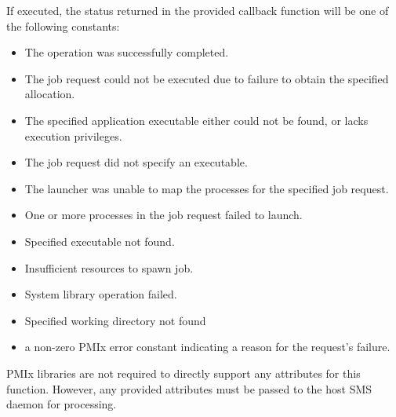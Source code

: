 \begin{arglist}
\end{arglist}

\returnsimplenb

If executed, the status returned in the provided callback function will be one of the following constants:

\begin{itemize}
\item {} The operation was successfully completed.
\item {} The job request could not be executed due to failure to obtain the specified allocation.
\item {} The specified application executable either could not be found, or lacks execution privileges.
\item {} The job request did not specify an executable.
\item {} The launcher was unable to map the processes for the specified job request.
\item {} One or more processes in the job request failed to launch.
\item {} Specified executable not found.
\item {} Insufficient resources to spawn job.
\item {} System library operation failed.
\item {} Specified working directory not found
\item a non-zero \ac{PMIx} error constant indicating a reason for the request's failure.
\end{itemize}

\reqattrstart
\ac{PMIx} libraries are not required to directly support any attributes for this function. However, any provided attributes must be passed to the host \ac{SMS} daemon for processing.

